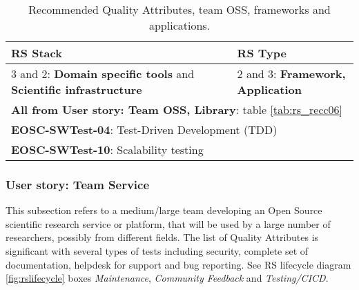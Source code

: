 \begin{center}
\begin{table}

  \label{tab:rs_recc07}
  \small
  \begin{tabular}{|p{0.65\linewidth}|p{0.35\linewidth}|} \hline

    \textbf{RS Stack} & \textbf{RS Type} \\ \hline \hline
    3 and 2: \textbf{Domain specific tools} and  \textbf{Scientific infrastructure} &
    2 and 3: \textbf{Framework, Application} \\ \hline \hline
    \multicolumn{2}{|l|}{\textbf{All from User story: Team OSS, Library}: table \ref{tab:rs_recc06}} \\ \hline
    \multicolumn{2}{|l|}{\textbf{EOSC-SWTest-04}: Test-Driven Development (TDD)} \\ \hline
    \multicolumn{2}{|l|}{\textbf{EOSC-SWTest-10}: Scalability testing} \\ \hline

  \end{tabular}
  \caption{Recommended Quality Attributes, team OSS, frameworks and applications.}
\end{table}
\end{center}

\subsubsection{User story: Team Service}

This subsection refers to a medium/large team developing an Open Source scientific research service or platform, that will be used by a large number of researchers, possibly from different fields. The list of Quality Attributes is significant with several types of tests including security, complete set of documentation, helpdesk for support and bug reporting. See RS lifecycle diagram \ref{fig:rslifecycle} boxes \textit{Maintenance}, \textit{Community Feedback} and \textit{Testing/CICD}.

